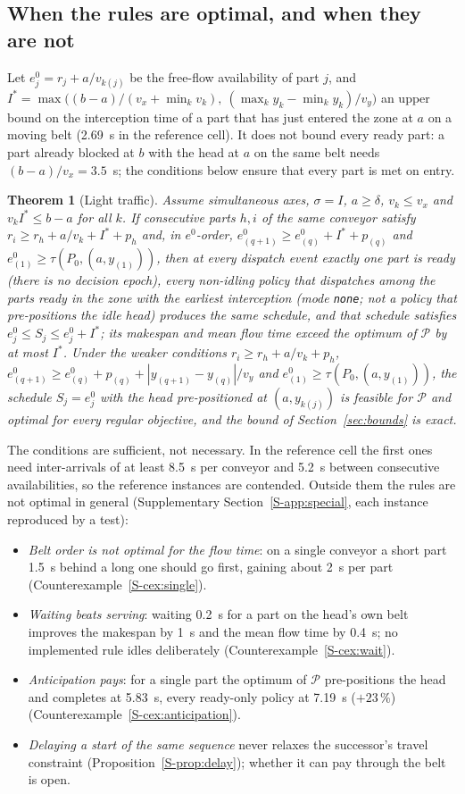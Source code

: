 \documentclass[11pt,a4paper]{article}
\theoremstyle{plain}
\newtheorem{theorem}{Theorem}
\theoremstyle{definition}
\theoremstyle{remark}
\newcommand{\Pb}{\mathcal{P}}
\newcommand{\Supp}[1]{Supplementary Section~\ref{S-#1}}
\begin{document}
\subsection{When the rules are optimal, and when they are not}\label{sec:special}
Let $e^0_j=r_j+a/v_{k(j)}$ be the free-flow availability of part $j$, and
$I^\ast=\max\bigl((b-a)/(v_x+\min_kv_k),\ (\max_ky_k-\min_ky_k)/v_y\bigr)$ an upper bound
on the interception time of a part that has just entered the zone at $a$ on a moving belt
(2.69~s in the reference cell). It does not bound every ready part: a part already blocked
at $b$ with the head at $a$ on the same belt needs $(b-a)/v_x=3.5$~s; the conditions below
ensure that every part is met on entry.
\begin{theorem}[Light traffic]\label{thm:light}
Assume simultaneous axes, $\sigma=I$, $a\ge\delta$, $v_k\le v_x$ and $v_kI^\ast\le b-a$ for
all $k$. If consecutive parts $h,i$ of the same conveyor satisfy
$r_i\ge r_h+a/v_k+I^\ast+p_h$ and, in $e^0$-order, $e^0_{(q+1)}\ge e^0_{(q)}+I^\ast+p_{(q)}$
and $e^0_{(1)}\ge\tau(P_0,(a,y_{(1)}))$, then at every dispatch event exactly one part is
ready (there is no decision epoch), every non-idling policy that dispatches among the parts
ready in the zone with the earliest interception (mode \texttt{none}; not a policy that
pre-positions the idle head) produces the same schedule, and that schedule satisfies
$e^0_j\le S_j\le e^0_j+I^\ast$; its makespan and mean flow time exceed the optimum of $\Pb$
by at most $I^\ast$. Under the weaker conditions $r_i\ge r_h+a/v_k+p_h$,
$e^0_{(q+1)}\ge e^0_{(q)}+p_{(q)}+|y_{(q+1)}-y_{(q)}|/v_y$ and
$e^0_{(1)}\ge\tau(P_0,(a,y_{(1)}))$, the schedule $S_j=e^0_j$ with the head pre-positioned at
$(a,y_{k(j)})$ is feasible for $\Pb$ and optimal for every regular objective, and the bound
of Section~\ref{sec:bounds} is exact.
\end{theorem}
The conditions are sufficient, not necessary. In the reference cell the first ones need
inter-arrivals of at least 8.5~s per conveyor and 5.2~s between consecutive availabilities,
so the reference instances are contended. Outside them the rules are not optimal in
general (\Supp{app:special}, each instance reproduced by a test):
\begin{itemize}[nosep]
\item \emph{Belt order is not optimal for the flow time}: on a single conveyor a short part
  1.5~s behind a long one should go first, gaining about 2~s per part
  (Counterexample~\ref{S-cex:single}).
\item \emph{Waiting beats serving}: waiting 0.2~s for a part on the head's own belt improves
  the makespan by 1~s and the mean flow time by 0.4~s; no implemented rule idles
  deliberately (Counterexample~\ref{S-cex:wait}).
\item \emph{Anticipation pays}: for a single part the optimum of $\Pb$ pre-positions the head
  and completes at 5.83~s, every ready-only policy at 7.19~s ($+23$\,\%)
  (Counterexample~\ref{S-cex:anticipation}).
\item \emph{Delaying a start of the same sequence} never relaxes the successor's travel
  constraint (Proposition~\ref{S-prop:delay}); whether it can pay through the belt is open.
\end{itemize}
\end{document}
